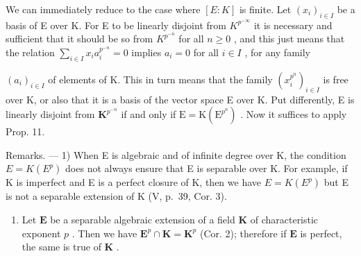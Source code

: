 We can immediately reduce to the case where \([E:K]\) is finite. Let \((x_{i})_{i\in I}\) be a basis of E over K. For E to be linearly disjoint from \(K^{p^{-\infty}}\) it is necessary and sufficient that it should be so from \(K^{p^{-n}}\) for all \(n\geqslant0\) , and this just means that the relation \(\sum_{i\in I}x_{i}a_{i}^{p^{-n}}=0\) implies \(a_{i}=0\) for all \(i\in I\) , for any family

\((a_{i})_{i\in I}\) of elements of K. This in turn means that the family \((x_{i}^{p^{n}})_{i\in I}\) is free over K, or also that it is a basis of the vector space E over K. Put differently, E is linearly disjoint from \(\mathbf{K}^{p^{-n}}\) if and only if \(\mathrm{E} = \mathrm{K}(\mathrm{E}^{p^n})\) . Now it suffices to apply Prop. 11.

Remarks. --- 1) When E is algebraic and of infinite degree over K, the condition \(E = K(E^{p})\) does not always ensure that E is separable over K. For example, if K is imperfect and E is a perfect closure of K, then we have \(E = K(E^{p})\) but E is not a separable extension of K (V, p.~39, Cor. 3).

\begin{enumerate}
\def\labelenumi{\arabic{enumi})}
\setcounter{enumi}{1}
\tightlist
\item
  Let \(\mathbf{E}\) be a separable algebraic extension of a field \(\mathbf{K}\) of characteristic exponent \(p\) . Then we have \(\mathbf{E}^p \cap \mathbf{K} = \mathbf{K}^p\) (Cor. 2); therefore if \(\mathbf{E}\) is perfect, the same is true of \(\mathbf{K}\) .
\end{enumerate}

